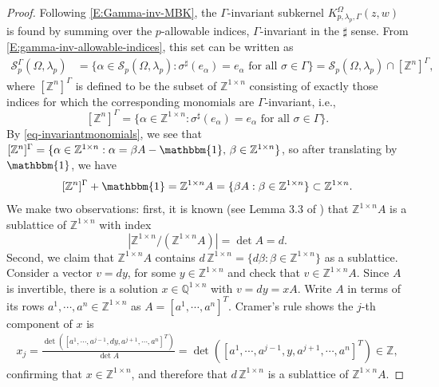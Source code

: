 \documentclass[letterpaper,11pt,reqno]{amsart}
\theoremstyle{plain}
\theoremstyle{definition}
\theoremstyle{remark}
\theoremstyle{remark}
\numberwithin{equation}{section}
\newcommand{\one}{\mathbbm{1}}
\newcommand{\abs}[1]{\left\vert#1\right\vert}
\newcommand{\cs}{{\mathcal S}}
\newcommand{\Q}{{\mathbb Q}}
\newcommand{\Z}{{\mathbb Z}}
\begin{document}
\begin{proof}
Following \eqref{E:Gamma-inv-MBK}, the $\Gamma$-invariant subkernel $K_{p,\lambda_p,\Gamma}^{\Omega}(z,w)$ is found by summing over the $p$-allowable indices, $\Gamma$-invariant in the $\sharp$ sense.  From \eqref{E:gamma-inv-allowable-indices}, this set can be written as
\begin{align}
\cs_p^\Gamma(\Omega,\lambda_p) &= \{\alpha \in \cs_p(\Omega,\lambda_p): \sigma^\sharp(e_\alpha) = e_\alpha \textrm{ for all } \sigma \in \Gamma  \} = \cs_p(\Omega,\lambda_p)\cap [\Z^n]^\Gamma \label{eq-zngamma},
\end{align}
where  $[\Z^n]^\Gamma$ is defined to be the subset of $\Z^{1\times n}$ consisting of exactly those indices for which the corresponding monomials are $\Gamma$-invariant, i.e.,
\[
[\Z^n]^\Gamma=\{\alpha\in \Z^{1\times n}: \sigma^\sharp(e_\alpha) = e_\alpha \textrm{ for all } \sigma \in \Gamma\}. 
\]
By \eqref{eq-invariantmonomials}, we see that
$[\Z^n]^\Gamma = \{\alpha\in \Z^{1\times n}:\alpha = \beta A -\one,\, \beta \in \Z^{1\times n}\}$, so after translating by $\one$, we have 
\[
[\Z^n]^\Gamma+\one=\Z^{1\times n}A= \{\beta A: \beta\in \Z^{1\times n}\} \subset \Z^{1\times n}.
\]
We make two observations: 
first, it is known (see Lemma 3.3 of \cite{NagPra21}) that $\Z^{1\times n}A$ is a sublattice of $\Z^{1 \times n}$ with index 
\begin{equation*}
    \abs{ \Z^{1 \times n}/(\Z^{1\times n}A)} = \det A = d.
\end{equation*}
Second, we claim that $\Z^{1\times n}A$ contains $d\,\Z^{1 \times n} = \{d\beta: \beta\in \Z^{1 \times n}\}$ as a sublattice.
Consider a vector $v = d  y$, for some $y \in \Z^{1 \times n}$ and check that $v \in \Z^{1\times n}A$. 
Since $A$ is invertible, there is a solution $x \in \Q^{1 \times n}$ with $v = d y = x A$.  
Write $A$ in terms of its rows $a^1, \cdots, a^n\in \Z^{1\times n}$ as $A=[a^1, \cdots, a^n]^T.$
Cramer's rule shows the $j$-th component of $x$ is
\begin{align*}
x_j = \frac{\det\left([a^1,\cdots,a^{j-1},d y, a^{j+1},\cdots,a^n]^T\right)}{\det A} = \det\left([a^1,\cdots,a^{j-1},y, a^{j+1},\cdots,a^n]^T\right) \in \Z,
\end{align*}
confirming that $x \in \Z^{1 \times n}$, and therefore that $d \, \Z^{1 \times n}$ is a sublattice of $\Z^{1 \times n}A$.  


\end{proof}
\end{document}
